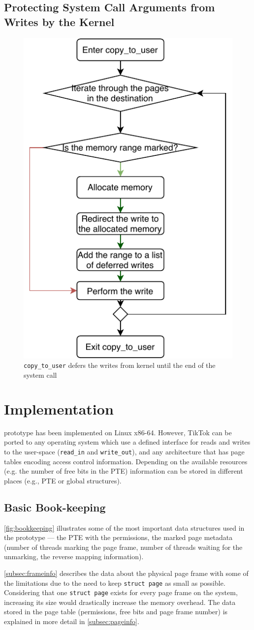 \subsection{Protecting System Call Arguments from Writes by the Kernel}
\label{subsec:kernelland}
\begin{figure}[]
  \centering
  \includegraphics[width = .30 \textwidth]{img/copy_to_user.pdf}
  \caption{\texttt{copy\_to\_user} defers the writes from kernel until the end
  of the system call}
  \label{fig:copytouser}
\end{figure}



\section{Implementation}
\label{sec:implementation}

\sysname prototype has been implemented on Linux x86-64. However, TikTok can be
ported to any operating system which use a defined interface for reads and
writes to the user-space (\texttt{read\_in} and \texttt{write\_out}), and any
architecture that has page tables encoding access control information. Depending
on the available resources (e.g. the number of free bits in the PTE) information
can be stored in different places (e.g., PTE or global structures).

\subsection{Basic Book-keeping}
\autoref{fig:bookkeeping} illustrates some of the most important data structures
used in the prototype --- the PTE with the permissions, the marked page metadata
(number of threads marking the page frame, number of threads waiting for the
unmarking, the reverse mapping information). 

\autoref{subsec:frameinfo} describes the data about the
physical page frame with some of the limitations due to the need to keep
\texttt{struct page} as small as possible. Considering that one \texttt{struct
page} exists for every page frame on the system, increasing its size would
drastically increase the memory overhead.  The data stored in the page table
(permissions, free bits and page frame number) is explained in more detail in
\autoref{subsec:pageinfo}.

